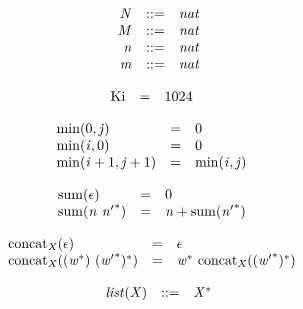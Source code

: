\vspace{1ex}

$$
\begin{array}{@{}lrrl@{}l@{}}
& {\mathit{N}} &::=& {\mathit{nat}} \\
& {\mathit{M}} &::=& {\mathit{nat}} \\
& {\mathit{n}} &::=& {\mathit{nat}} \\
& {\mathit{m}} &::=& {\mathit{nat}} \\
\end{array}
$$

\vspace{1ex}

$$
\begin{array}{@{}lcl@{}l@{}}
{\mathrm{Ki}} &=& 1024 &  \\
\end{array}
$$

\vspace{1ex}

$$
\begin{array}{@{}lcl@{}l@{}}
{\mathrm{min}}(0, {\mathit{j}}) &=& 0 &  \\
{\mathrm{min}}({\mathit{i}}, 0) &=& 0 &  \\
{\mathrm{min}}({\mathit{i}} + 1, {\mathit{j}} + 1) &=& {\mathrm{min}}({\mathit{i}}, {\mathit{j}}) &  \\
\end{array}
$$

$$
\begin{array}{@{}lcl@{}l@{}}
{\mathrm{sum}}(\epsilon) &=& 0 &  \\
{\mathrm{sum}}({\mathit{n}}~{{\mathit{n}'}^\ast}) &=& {\mathit{n}} + {\mathrm{sum}}({{\mathit{n}'}^\ast}) &  \\
\end{array}
$$

\vspace{1ex}

$$
\begin{array}{@{}lcl@{}l@{}}
{{\mathrm{concat}}}_{{\mathit{X}}}(\epsilon) &=& \epsilon &  \\
{{\mathrm{concat}}}_{{\mathit{X}}}(({{\mathit{w}}^\ast})~{({{\mathit{w}'}^\ast})^\ast}) &=& {{\mathit{w}}^\ast}~{{\mathrm{concat}}}_{{\mathit{X}}}({({{\mathit{w}'}^\ast})^\ast}) &  \\
\end{array}
$$

$$
\begin{array}{@{}lrrl@{}l@{}}
& {\mathit{list}}({\mathit{X}}) &::=& {{\mathit{X}}^\ast} \\
\end{array}
$$


